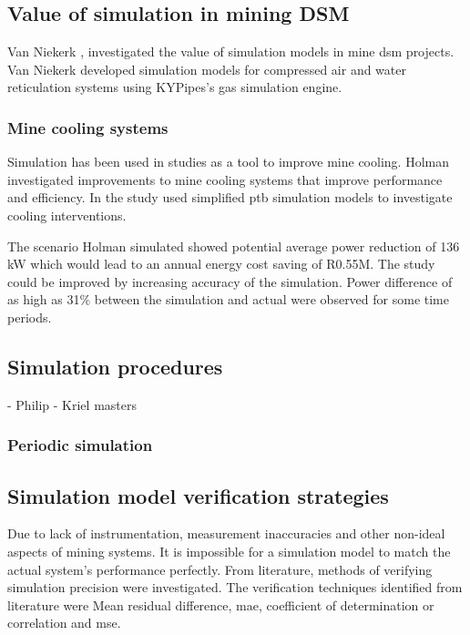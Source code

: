 	\subsection{Value of simulation in mining DSM}
	Van Niekerk \cite{van2013value},\cite{vanNiekerk2012Value} investigated the value of simulation models in mine \gls{dsm} projects. Van Niekerk developed simulation models for compressed air and water reticulation systems using KYPipes's gas simulation engine. \\
	
	\subsubsection{Mine cooling systems}
	Simulation has been used in studies as a tool to improve mine cooling. Holman \cite{Holman2014Masters} investigated improvements to mine cooling systems that improve performance and efficiency. In the study \cite{Holman2014Masters}  used simplified \gls{ptb}  simulation models to investigate cooling interventions.
	\par 
	The scenario Holman simulated showed potential  average power reduction of 136 kW  which would lead to an annual energy cost saving of R0.55M. The study could be improved by increasing accuracy of the simulation. Power difference of as high as 31\% between the simulation and actual were observed for some time periods.
	
		
	\subsection{Simulation procedures}
		- Philip
		- Kriel masters\\
	\subsubsection{Periodic simulation}
	
 	\subsection{Simulation model verification strategies}\label{VerificationLit}
 	Due to lack of instrumentation, measurement inaccuracies and other non-ideal aspects of mining systems. It is impossible for a simulation model to match the actual system's performance perfectly. From literature, methods of verifying simulation precision were investigated. The verification techniques identified from literature were Mean residual difference, \gls{mae}, coefficient of determination or correlation and \gls{mse}.%
